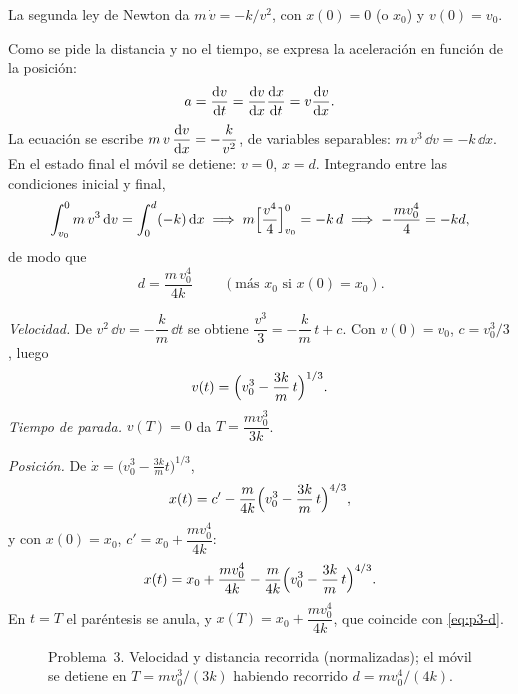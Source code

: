 \begin{solucion}
La segunda ley de Newton da $m\,\dot v=-k/v^2$, con $x(0)=0$ (o $x_0$) y $v(0)=v_0$.

Como se pide la distancia y no el tiempo, se expresa la aceleración en función de la posición:
\[
  a=\dfrac{\mathrm{d} v}{\mathrm{d} t}=\dfrac{\mathrm{d} v}{\mathrm{d} x}\dfrac{\mathrm{d} x}{\mathrm{d} t}=v\dfrac{\mathrm{d} v}{\mathrm{d} x}.
\]
La ecuación se escribe $m\,v\,\dfrac{\mathrm{d} v}{\mathrm{d} x}=-\dfrac{k}{v^2}$, de variables separables: $m\,v^3\,\dd v=-k\,\dd x$. En el estado final el móvil se detiene: $v=0$, $x=d$. Integrando entre las condiciones inicial y final,
\[
  \int_{v_0}^{0}m\,v^3\,\mathrm{d} v=\int_0^d(-k)\,\mathrm{d} x
  \;\Longrightarrow\;
  m\Bigl[\frac{v^4}{4}\Bigr]_{v_0}^{0}=-k\,d
  \;\Longrightarrow\;
  -\frac{mv_0^4}{4}=-kd,
\]
de modo que
\begin{equation}
  \boxed{\,d=\frac{m\,v_0^4}{4k}\,}\qquad(\text{más }x_0\text{ si }x(0)=x_0).
  \label{eq:p3-d}
\end{equation}

\emph{Velocidad.} De $v^2\,\dd v=-\dfrac km\,\dd t$ se obtiene $\dfrac{v^3}{3}=-\dfrac km\,t+c$. Con $v(0)=v_0$, $c=v_0^3/3$, luego
\[
  v(t)=\Bigl(v_0^3-\frac{3k}{m}\,t\Bigr)^{1/3}.
\]
\emph{Tiempo de parada.} $v(T)=0$ da $T=\dfrac{mv_0^3}{3k}$.

\emph{Posición.} De $\dot x=\bigl(v_0^3-\tfrac{3k}{m}t\bigr)^{1/3}$,
\[
  x(t)=c'-\frac{m}{4k}\Bigl(v_0^3-\frac{3k}{m}\,t\Bigr)^{4/3},
\]
y con $x(0)=x_0$, $c'=x_0+\dfrac{mv_0^4}{4k}$:
\[
  x(t)=x_0+\frac{mv_0^4}{4k}-\frac{m}{4k}\Bigl(v_0^3-\frac{3k}{m}\,t\Bigr)^{4/3}.
\]
En $t=T$ el paréntesis se anula, y $x(T)=x_0+\dfrac{mv_0^4}{4k}$, que coincide con \eqref{eq:p3-d}.
\end{solucion}

\begin{figure}[H]
  \centering
  \caption{Problema~3. Velocidad y distancia recorrida (normalizadas); el móvil se detiene en $T=mv_0^3/(3k)$ habiendo recorrido $d=mv_0^4/(4k)$.}
  \label{fig:p3}
\end{figure}

